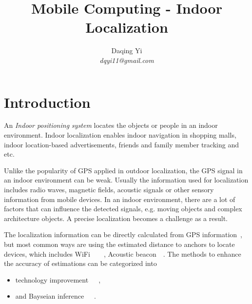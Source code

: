 \documentclass[letterpaper]{article}
\begin{document}
%
\title{Mobile Computing - Indoor Localization}

\author{Daqing Yi\\
\emph{dqyi11@gmail.com}
}
\maketitle

\section{Introduction}

An \emph{Indoor positioning system} locates the objects or people in an indoor environment.
Indoor localization enables indoor navigation in shopping malls, indoor location-based advertisements, friends and family member tracking and etc.

Unlike the popularity of GPS applied in outdoor localization, the GPS signal in an indoor environment can be weak.
Usually the information used for localization includes radio waves, magnetic fields, acoustic signals or other sensory information from mobile devices.
In an indoor environment, there are a lot of factors that can influence the detected signals, e.g. moving objects and complex architecture objects.
A precise localization becomes a challenge as a result.

The localization information can be directly calculated from GPS information~\cite{Nirjon:2014:CIL:2594368.2594378}, but most common ways are using the estimated distance to anchors to locate devices, which includes WiFi~\cite{Sen:2013:AMR:2462456.2464463}~\cite{Wang:2012:NNW:2307636.2307655}~\cite{Rai:2012:ZZC:2348543.2348580}~\cite{Nandakumar:2012:CLD:2348543.2348579}, Acoustic beacon~\cite{Liu:2013:GEF:2462456.2464450}~\cite{Nandakumar:2012:CLD:2348543.2348579}.
The methods to enhance the accuracy of estimations can be categorized into
\begin{itemize}
	\item technology improvement~\cite{Nirjon:2014:CIL:2594368.2594378}~\cite{Sen:2013:AMR:2462456.2464463}~\cite{Liu:2013:GEF:2462456.2464450}, 
	\item and Bayseian inference~\cite{Wang:2012:NNW:2307636.2307655}~\cite{Nandakumar:2012:CLD:2348543.2348579}~\cite{Rai:2012:ZZC:2348543.2348580}.
\end{itemize}
\end{document}
